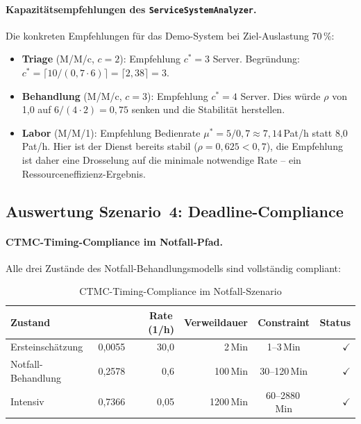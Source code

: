 ﻿\documentclass[a4paper,12pt]{report}
\theoremstyle{definition}
\begin{document}
\paragraph{Kapazitätsempfehlungen des \texttt{ServiceSystemAnalyzer}.}
Die konkreten Empfehlungen für das Demo-System bei Ziel-Auslastung 70\,\%:
\begin{itemize}
	\item[-] \textbf{Triage} (M/M/c, $c=2$): Empfehlung $c^* = 3$ Server.
	Begründung: $c^* = \lceil 10/(0{,}7 \cdot 6) \rceil = \lceil 2{,}38 \rceil = 3$.
	\item[-] \textbf{Behandlung} (M/M/c, $c=3$): Empfehlung $c^* = 4$ Server.
	Dies würde $\rho$ von 1{,}0 auf $6/(4 \cdot 2) = 0{,}75$ senken und
	die Stabilität herstellen.
	\item[-] \textbf{Labor} (M/M/1): Empfehlung Bedienrate
	$\mu^* = 5/0{,}7 \approx 7{,}14$\,Pat/h statt 8{,}0\,Pat/h.
	Hier ist der Dienst bereits stabil ($\rho = 0{,}625 < 0{,}7$),
	die Empfehlung ist daher eine Drosselung auf die minimale
	notwendige Rate -- ein Ressourceneffizienz-Ergebnis.
\end{itemize}

\subsection{Auswertung Szenario~4: Deadline-Compliance}

\paragraph{CTMC-Timing-Compliance im Notfall-Pfad.}
Alle drei Zustände des Notfall-Behand\-lungsmodells sind vollständig compliant:

\begin{table}[H]
	\centering
	\begin{tabular}{@{}lrrrcr@{}}
		\toprule
		\textbf{Zustand} & \boldmath{$\pi_i$} & \textbf{Rate}\,(1/h) &
		\textbf{Verweildauer} & \textbf{Constraint} & \textbf{Status} \\
		\midrule
		Ersteinschätzung  & 0{,}0055 & 30{,}0 &  2\,Min & 1--3\,Min   & $\checkmark$ \\
		Notfall-Behandlung& 0{,}2578 &  0{,}6 & 100\,Min& 30--120\,Min& $\checkmark$ \\
		Intensiv          & 0{,}7366 & 0{,}05 &1200\,Min& 60--2880\,Min&$\checkmark$ \\
		\bottomrule
	\end{tabular}
	\caption{CTMC-Timing-Compliance im Notfall-Szenario}
	\label{tab:ctmc-compliance-auswertung}
\end{table}
\end{document}
